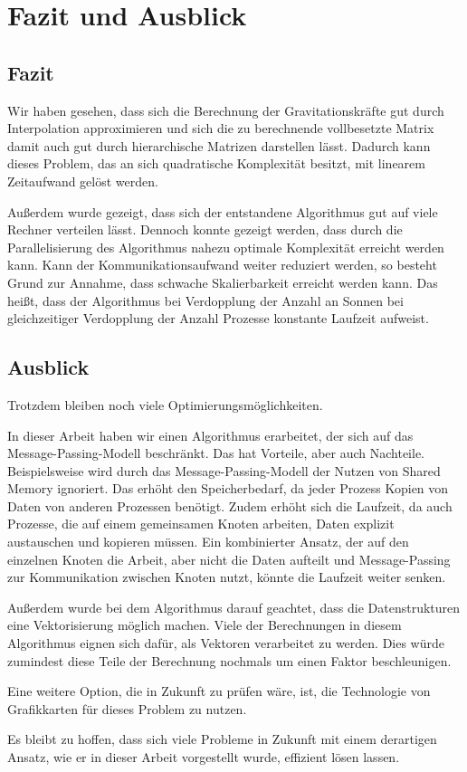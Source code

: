 \chapter{Fazit und Ausblick}
\label{chp:Conclusions}
  \section{Fazit}
    Wir haben gesehen, dass sich die Berechnung der Gravitationskräfte gut durch Interpolation approximieren und sich die zu berechnende vollbesetzte Matrix damit auch gut durch hierarchische Matrizen
    darstellen lässt. Dadurch kann dieses Problem, das an sich quadratische Komplexität besitzt, mit linearem Zeitaufwand gelöst werden.
    
    Außerdem wurde gezeigt, dass sich der entstandene Algorithmus gut auf viele Rechner verteilen lässt.
    Dennoch konnte gezeigt werden, dass durch die Parallelisierung des Algorithmus nahezu optimale Komplexität erreicht werden kann. Kann der Kommunikationsaufwand weiter reduziert werden, so besteht
    Grund zur Annahme, dass schwache Skalierbarkeit erreicht werden kann. Das heißt, dass der Algorithmus bei Verdopplung der Anzahl an Sonnen bei gleichzeitiger Verdopplung der Anzahl Prozesse 
    konstante Laufzeit aufweist.
    
  \section{Ausblick}
  \label{sec:ausblick}
    Trotzdem bleiben noch viele Optimierungsmöglichkeiten. 
    
    In dieser Arbeit haben wir einen Algorithmus erarbeitet, der sich auf das Message-Passing-Modell beschränkt. Das hat Vorteile,
    aber auch Nachteile. Beispielsweise wird durch das Message-Passing-Modell der Nutzen von Shared Memory ignoriert. Das erhöht den Speicherbedarf, da jeder Prozess Kopien von Daten von anderen
    Prozessen benötigt. Zudem erhöht sich die Laufzeit, da auch Prozesse, die auf einem gemeinsamen Knoten arbeiten, Daten explizit austauschen und kopieren müssen. Ein kombinierter Ansatz,
    der auf den einzelnen Knoten die Arbeit, aber nicht die Daten aufteilt und Message-Passing zur Kommunikation zwischen Knoten nutzt, könnte die Laufzeit weiter senken.
    
    Außerdem wurde bei dem Algorithmus darauf geachtet, dass die Datenstrukturen eine Vektorisierung möglich machen. Viele der Berechnungen in diesem Algorithmus eignen sich dafür, als Vektoren
    verarbeitet zu werden. Dies würde zumindest diese Teile der Berechnung nochmals um einen Faktor beschleunigen.
    
    Eine weitere Option, die in Zukunft zu prüfen wäre, ist, die Technologie von Grafikkarten für dieses Problem zu nutzen.
    
    Es bleibt zu hoffen, dass sich viele Probleme in Zukunft mit einem derartigen Ansatz, wie er in dieser Arbeit vorgestellt wurde, effizient lösen lassen.